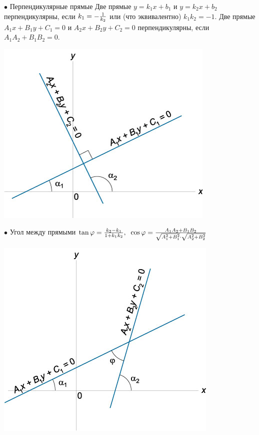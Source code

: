 \documentclass[oneside]{book}
\begin{document}
\begin{enumerate}
\begin{itemize}
\begin{enumerate}
$\bullet$ Перпендикулярные прямые
Две прямые $y = {k_1}x + {b_1} $ и $ y = {k_2}x + {b_2}$ перпендикулярны, если
${k_1} = - \large\frac{1}{{{k_2}}}\normalsize$ или (что эквивалентно) ${k_1}{k_2} = - 1$.
Две прямые ${A_1}x + {B_1}y + {C_1} = 0$ и ${A_2}x + {B_2}y + {C_2} = 0$ перпендикулярны, если
${A_1}{A_2} + {B_1}{B_2} = 0$.
\begin{center}
\includegraphics[scale=0.4]{./pics/16.jpg}
\end{center}

$\bullet$ Угол между прямыми  
$\tan \varphi = \large\frac{{{k_2} - {k_1}}}{{1 + {k_1}{k_2}}}\normalsize,\;\;\cos \varphi = \large\frac{{{A_1}{A_2} + {B_1}{B_2}}}{{\sqrt {A_1^2 + B_1^2} \cdot \sqrt {A_2^2 + B_2^2} }}\normalsize$
\begin{center}
\includegraphics[scale=0.4]{./pics/17.jpg}
\end{center}


\end{enumerate}
\end{itemize}
\end{enumerate}
\end{document}
